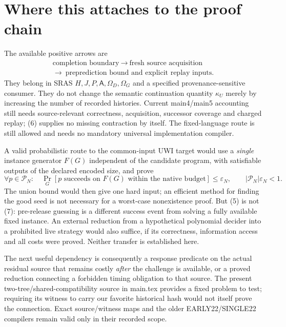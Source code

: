 \documentclass[11pt]{article}
\begin{document}
\section{Where this attaches to the proof chain}
The available positive arrows are
\[
 \begin{gathered}
 \text{completion boundary}\ \longrightarrow\
 \text{fresh source acquisition}\\
 \longrightarrow\ \text{preprediction bound and explicit replay inputs}.
 \end{gathered} \tag{6}
\]
They belong in SRAS $H,J,P,\mathsf A,\Omega_D,\Omega_G$ and a specified
provenance-sensitive consumer. They do not change the semantic continuation
quantity $\kappa_U$ merely by increasing the number of recorded histories.
Current main4/main5 accounting still needs source-relevant correctness,
acquisition, successor coverage and charged replay; (6) supplies no missing
contraction by itself. The fixed-language route is still allowed and needs
no mandatory universal implementation compiler.

A valid probabilistic route to the common-input UWI target would use a
\emph{single} instance generator $F(G)$ independent of the candidate program,
with satisfiable outputs of the declared encoded size, and prove
\[
 \forall p\in\mathcal P_N:\quad
 \Pr_G[p\text{ succeeds on }F(G)\text{ within the native budget}]
 \le\varepsilon_N,\qquad |\mathcal P_N|\varepsilon_N<1.   \tag{7}
\]
The union bound would then give one hard input; an efficient method for finding
the good seed is not necessary for a worst-case nonexistence proof. But (5)
is not (7): pre-release guessing is a different success event from solving a
fully available fixed instance. An external reduction from a hypothetical
polynomial decider into a prohibited live strategy would also suffice, if its
correctness, information access and all costs were proved. Neither transfer
is established here.

The next useful dependency is consequently a response predicate on the actual
residual source that remains costly \emph{after} the challenge is available,
or a proved reduction connecting a forbidden timing obligation to that source.
The present two-tree/shared-compatibility source in main.tex provides a fixed
problem to test; requiring its witness to carry our favorite historical hash
would not itself prove the connection. Exact source/witness maps and the older
EARLY22/SINGLE22 compilers remain valid only in their recorded scope.
\end{document}
